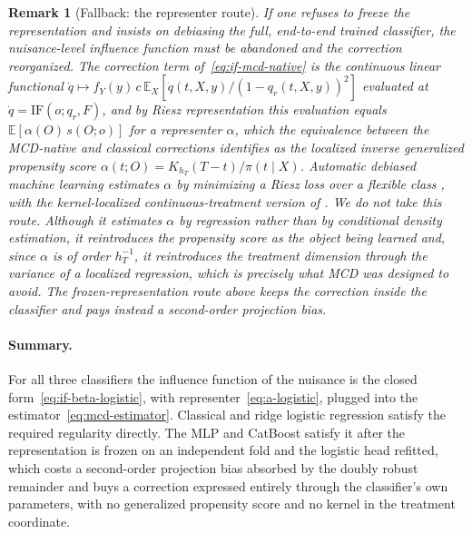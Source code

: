 \documentclass[11pt]{article}
\newtheorem*{remark}{Remark}
\newcommand{\Eb}{\mathbb{E}}
\newcommand{\IF}{\mathrm{IF}}
\begin{document}
\begin{remark}[Fallback: the representer route]
If one refuses to freeze the representation and insists on debiasing the full,
end-to-end trained classifier, the nuisance-level influence function must be abandoned
and the correction reorganized. The correction term of~\eqref{eq:if-mcd-native} is the
continuous linear functional
$\dot q\mapsto f_Y(y)\,c\,\Eb_X[\dot q(t,X,y)/(1-q_r(t,X,y))^2]$ evaluated at
$\dot q=\IF(o;q_r,F)$, and by Riesz representation this evaluation equals
$\Eb[\alpha(O)\,s(O;o)]$ for a representer $\alpha$, which the equivalence between the
MCD-native and classical corrections identifies as the localized inverse generalized
propensity score $\alpha(t;O)=K_{h_T}(T-t)/\pi(t\mid X)$. Automatic debiased machine
learning estimates $\alpha$ by minimizing a Riesz loss over a flexible class
\citep{chernozhukov2022autodml,chernozhukov2022riesznet,kato2026riesz}, with the
kernel-localized continuous-treatment version of \citet{colangelo2020}. We do not take
this route. Although it estimates $\alpha$ by regression rather than by conditional
density estimation, it reintroduces the propensity score as the object being learned
and, since $\alpha$ is of order $h_T^{-1}$, it reintroduces the treatment dimension
through the variance of a localized regression, which is precisely what MCD was
designed to avoid. The frozen-representation route above keeps the correction inside
the classifier and pays instead a second-order projection bias.
\end{remark}

\paragraph{Summary.}
For all three classifiers the influence function of the nuisance is the closed
form~\eqref{eq:if-beta-logistic}, with representer~\eqref{eq:a-logistic}, plugged into
the estimator~\eqref{eq:mcd-estimator}. Classical and ridge logistic regression satisfy
the required regularity directly. The MLP and CatBoost satisfy it after the
representation is frozen on an independent fold and the logistic head refitted, which
costs a second-order projection bias absorbed by the doubly robust remainder and buys a
correction expressed entirely through the classifier's own parameters, with no
generalized propensity score and no kernel in the treatment coordinate.




\end{document}
